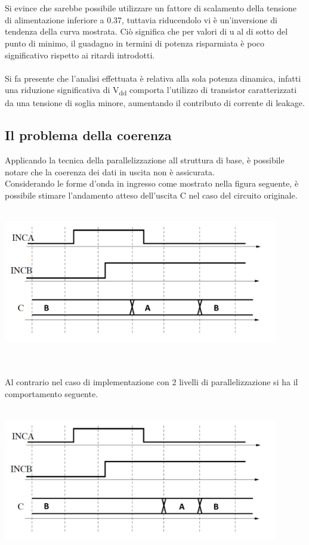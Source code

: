 \documentclass[11pt,  english, makeidx, a4paper, titlepage, oneside]{book}
\begin{document}
\\\\
Si evince che sarebbe possibile utilizzare un fattore di scalamento della tensione di alimentazione inferiore a 0.37, tuttavia riducendolo vi è un'inversione di tendenza della curva mostrata. Ciò significa che per valori di u al di sotto del punto di minimo, il guadagno in termini di potenza risparmiata è poco significativo rispetto ai ritardi introdotti.
\\\\
Si fa presente che l'analisi effettuata è relativa alla sola potenza dinamica, infatti una riduzione significativa di V\textsubscript{dd} comporta l'utilizzo di transistor caratterizzati da una tensione di soglia minore, aumentando il contributo di corrente di leakage.
\subsection{Il problema della coerenza}
Applicando la tecnica della parallelizzazione all struttura di base, è possibile notare che la coerenza dei dati in uscita non è assicurata.
\\
Considerando le forme d'onda in ingresso come mostrato nella figura seguente, è possibile stimare l'andamento atteso dell'uscita C nel caso del circuito originale.
\\\\
\centerline{\includegraphics[width=12cm]{./img/Lab_3/Comportamento_atteso.png}}
\\\\
Al contrario nel caso di implementazione con 2 livelli di parallelizzazione si ha il comportamento seguente.
\\\\
\centerline{\includegraphics[width=12cm]{./img/Lab_3/Comportamento_attuale.png}}
\end{document}
